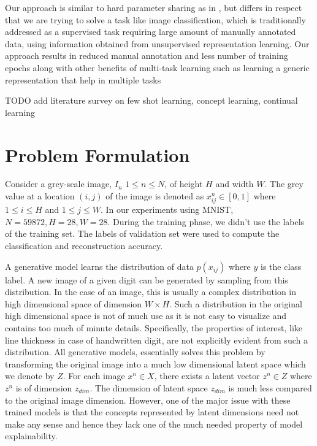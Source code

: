 \documentclass[journal]{IEEEtran}
\begin{document}
Our approach is similar to hard parameter sharing as in \cite{mtl_zhang_2014} \cite{mtl_2016_dai}, but differs in respect that we are trying to solve a task like image classification, which is traditionally addressed as a supervised task requiring large amount of manually annotated data, using information obtained from  unsupervised representation learning. Our approach results in reduced manual annotation and less number of training epochs along with other benefits of multi-task learning such as learning a generic representation that help in multiple tasks

TODO add literature survey on few shot learning, concept learning, continual learning

\section{Problem Formulation} \label{problem_formulation}
Consider a grey-scale image, $I_n$  $1\leq n \leq N$,  of height  $H$ and width $W$. The grey value at a location $(i, j)$ of the image is denoted  as $x_{ij}^{n} \in [0,1]$  where $1 \leq i \leq H$  and  $1\leq j \leq W$. In our experiments using MNIST, $N= 59872, H=28,  W= 28$. During the training phase, we didn't use the labels of the training set. The labels of validation set were used to compute the classification and reconstruction accuracy. 
 
 A generative model learns the distribution of data $p(x_{ij})$ where $y$ is the class label. A new image of a given digit can be generated by sampling from this distribution. In the case of an image, this is usually a complex distribution in high dimensional space of dimension $W \times H$. Such a distribution in the original high dimensional space is not of much use as it is not easy to visualize and contains too much of  minute details. Specifically, the properties of interest, like line thickness in case of handwritten digit, are not explicitly evident from such a distribution.   All generative models, essentially solves this problem by transforming the original image into a much low dimensional latent space which we denote by  $Z$. For each image $x^n \in X$, there exists a latent vector  $z^n \in Z$  where $z^n$ is of dimension $z_{dim}$. The dimension of latent space $z_{dim}$ is much less compared to the original image dimension. However, one of the major issue with these trained models is that the concepts represented by latent dimensions need not make any sense and hence they lack one of the much needed property of model explainability.
 
\end{document}
